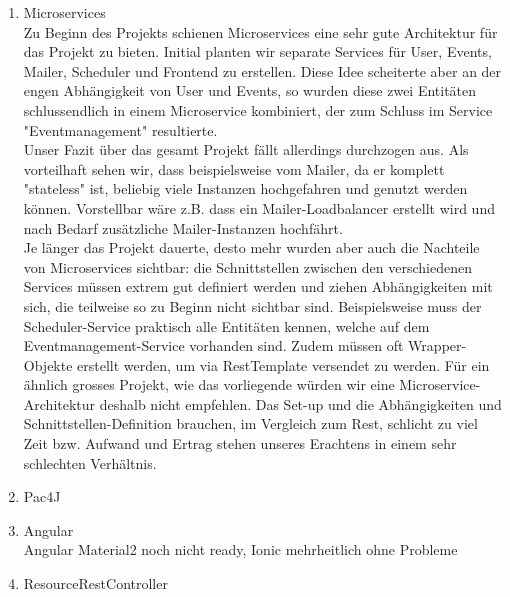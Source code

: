 \documentclass[11pt]{article} %
\begin{document}
\begin{enumerate}
\item Microservices\\
Zu Beginn des Projekts schienen Microservices eine sehr gute Architektur für das Projekt zu bieten. Initial planten wir separate Services für User, Events, Mailer, Scheduler und Frontend zu erstellen. Diese Idee scheiterte aber an der engen Abhängigkeit von User und Events, so wurden diese zwei Entitäten schlussendlich in einem Microservice kombiniert, der zum Schluss im Service "Eventmanagement" resultierte.
\\
Unser Fazit über das gesamt Projekt fällt allerdings durchzogen aus. Als vorteilhaft sehen wir, dass beispielsweise vom Mailer, da er komplett "stateless" ist, beliebig viele Instanzen hochgefahren und genutzt werden können. Vorstellbar wäre z.B. dass ein Mailer-Loadbalancer erstellt wird und nach Bedarf zusätzliche Mailer-Instanzen hochfährt.
\\
Je länger das Projekt dauerte, desto mehr wurden aber auch die Nachteile von Microservices sichtbar: die Schnittstellen zwischen den verschiedenen Services müssen extrem gut definiert werden und ziehen Abhängigkeiten mit sich, die teilweise so zu Beginn nicht sichtbar sind. Beispielsweise muss der Scheduler-Service praktisch alle Entitäten kennen, welche auf dem Eventmanagement-Service vorhanden sind. Zudem müssen oft Wrapper-Objekte erstellt werden, um via RestTemplate versendet zu werden. Für ein ähnlich grosses Projekt, wie das vorliegende würden wir eine Microservice-Architektur deshalb nicht empfehlen. Das Set-up und die Abhängigkeiten und Schnittstellen-Definition brauchen, im Vergleich zum Rest, schlicht zu viel Zeit bzw. Aufwand und Ertrag stehen unseres Erachtens in einem sehr schlechten Verhältnis.
\item Pac4J\\
\item Angular\\
Angular Material2 noch nicht ready, Ionic mehrheitlich ohne Probleme
\item ResourceRestController
\end{enumerate}
\end{document}
